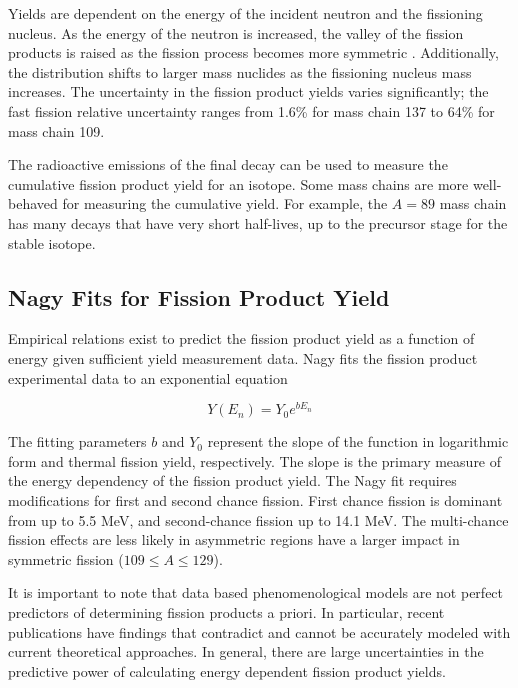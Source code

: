 Yields are dependent on the energy of the incident neutron and the fissioning nucleus. 
As the energy of the neutron is increased, the valley of the fission products is raised as the fission process becomes more symmetric \cite{Tonchev0}. 
Additionally, the distribution shifts to larger mass nuclides as the fissioning nucleus mass increases. 
The uncertainty in the fission product yields varies significantly; the fast fission relative uncertainty ranges from 1.6\% for mass chain 137 to 64\% for mass chain 109.   

The radioactive emissions of the final decay can be used to measure the cumulative fission product yield for an isotope. 
Some mass chains are more well-behaved for measuring the cumulative yield. For example, the $A=89$ mass chain has many decays that have very short half-lives, up to the precursor stage for the stable isotope. 


\subsection{Nagy Fits for Fission Product Yield}

Empirical relations exist to predict the fission product yield as a function of energy given sufficient yield measurement data. 
Nagy fits the fission product experimental data to an exponential equation 

\begin{equation} \label{eq:nagy}
Y(E_{n}) = Y_{0}e^{bE_{n}}
\end{equation}

The fitting parameters $b$ and $Y_{0}$ represent the slope of the function in logarithmic form and thermal fission yield, respectively\cite{Nagy1978}. 
The slope is the primary measure of the energy dependency of the fission product yield. 
The Nagy fit requires  modifications for first and second chance fission. 
First chance fission is dominant from up to 5.5 MeV, and second-chance fission up to 14.1 MeV\cite{Nagy1978}. 
The multi-chance fission effects are less likely in asymmetric regions have a larger impact in symmetric fission ($109 \leq A \leq 129$)\cite{Bevins}. 

It is important to note that data based phenomenological models are not perfect predictors of determining fission products a priori. 
In particular, recent publications have findings that contradict and cannot be accurately modeled with current theoretical approaches\cite{Tonchev0}. 
In general, there are large uncertainties in the predictive power of calculating energy dependent fission product yields. 

